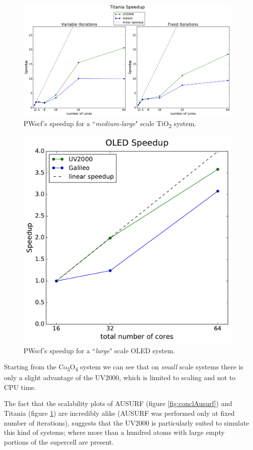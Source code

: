 \documentclass[a4paper,12pt]{article}
\newcommand\CO{Co\textsubscript{3}O\textsubscript{4} }
\begin{document}
\begin{figure}[hhh!]
\centerline{ \includegraphics[width=1.\linewidth]{concl_titania.pdf}	}
	\caption{PWscf's speedup for a ``\textit{medium-large}" scale TiO\textsubscript{2} system.}
	\label{fig:conclTitania}
\end{figure}

\newpage
\begin{figure}[hhh!]
\centerline{ \includegraphics[width=0.5\linewidth]{concl_oled.pdf}	}
	\caption{PWscf's speedup for a ``\textit{large}" scale OLED system.}
	\label{fig:conclOled}
\end{figure}


Starting from the \CO system we can see that on \textit{small} scale systems there is only a slight advantage of the UV2000, which is limited to scaling and not to CPU time.


The fact that the scalability plots of AUSURF (figure \ref{fig:conclAusurf}) and Titania (figure \ref{fig:conclTitania}) are incredibly alike (AUSURF was performed only at fixed number of iterations), suggests that the UV2000 is particularly suited to simulate this kind of systems; 
where more than a hundred atoms with large empty portions of the supercell are present.
\end{document}
